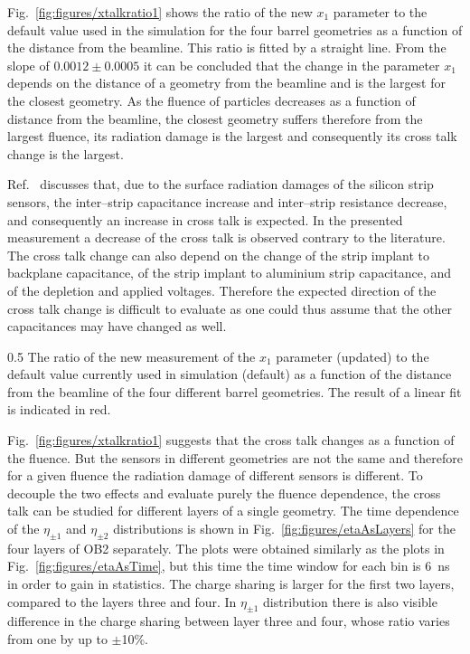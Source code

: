 Fig.~\ref{fig:figures/xtalkratio1} shows the ratio of  the new $x_{1}$ parameter to the default value used in the simulation for the four barrel geometries as a function of the distance from the beamline. This ratio is fitted by a straight line. From the slope of $0.0012 \pm 0.0005$ it can be concluded that the change in the parameter $x_{1}$ depends on the distance of a geometry from the beamline and is the largest for the closest geometry. As the fluence of particles decreases as a function of distance from the beamline, the closest geometry suffers therefore from the largest fluence, its radiation damage is the largest and consequently its cross talk change is the largest.  

Ref.~\cite{Hartmann:2017gzy} discusses that, due to the surface radiation damages of the silicon strip sensors, the inter--strip capacitance increase and inter--strip resistance decrease, and consequently an increase in cross talk is expected. In the presented measurement a decrease of the cross talk is observed contrary to the literature. The cross talk change can also depend on the change of the strip implant to backplane capacitance, of the strip implant to aluminium strip capacitance, and of the depletion and applied voltages. Therefore the expected direction of the cross talk change is difficult to evaluate as one could thus assume that the other capacitances may have changed as well.

                 {0.5}       %
                 {The ratio of the new measurement of the $x_{1}$ parameter (updated) to the default value currently used in simulation (default) as a function of the distance from the beamline of the four different barrel geometries. The result of a linear fit is indicated in red. }


Fig.~\ref{fig:figures/xtalkratio1} suggests that the cross talk changes as a function of the fluence. But the sensors in different geometries are not the same and therefore for a given fluence the radiation damage of different sensors is different. To decouple the two effects and evaluate purely the fluence dependence, the cross talk can be studied for different layers of a single geometry. The time dependence of the $\eta_{\pm 1}$ and $\eta_{\pm 2}$ distributions is shown in Fig.~\ref{fig:figures/etaAsLayers} for the four layers of OB2 separately. The plots were obtained similarly as the plots in Fig.~\ref{fig:figures/etaAsTime}, but this time the time window for each bin is 6~ns in order to gain in statistics. The charge sharing is larger for the first two layers, compared to the layers three and four. In  $\eta_{\pm 1}$ distribution there is also visible difference in the charge sharing between layer three and four, whose ratio varies from one by up to $\pm$10\%. 

